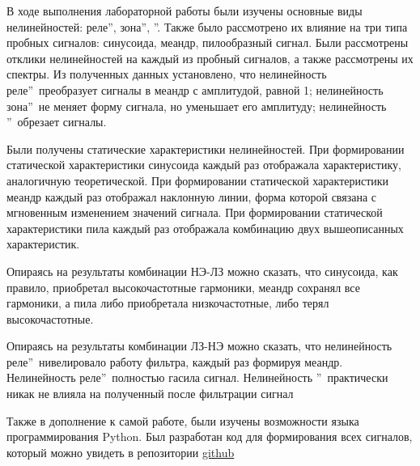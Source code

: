 В ходе выполнения лабораторной работы были изучены основные виды
нелинейностей:  реле\textquotedblright,
 зона\textquotedblright,
\textquotedblright. Также было
рассмотрено их влияние на три типа пробных сигналов: синусоида,
меандр, пилообразный сигнал. Были рассмотрены отклики нелинейностей
на каждый из пробный сигналов, а также рассмотрены их спектры.
Из полученных данных установлено, что нелинейность
 реле\textquotedblright\ преобразует сигналы
в меандр с амплитудой, равной 1; нелинейность
 зона\textquotedblright\ не меняет форму
сигнала, но уменьшает его амплитуду; нелинейность
\textquotedblright\ обрезает сигналы.

Были получены статические характеристики нелинейностей. При формировании
статической характеристики синусоида каждый раз отображала характеристику,
аналогичную теоретической. При формировании статической характеристики
меандр каждый раз отображал наклонную линии, форма которой связана с
мгновенным изменением значений сигнала. При формировании статической
характеристики пила каждый раз отображала комбинацию двух вышеописанных
характеристик. 

Опираясь на результаты комбинации НЭ-ЛЗ можно сказать, что синусоида,
как правило, приобретал высокочастотные гармоники, меандр сохранял
все гармоники, а пила либо приобретала низкочастотные, либо терял
высокочастотные.

Опираясь на результаты комбинации ЛЗ-НЭ можно сказать, что
нелинейность  реле\textquotedblright\ 
нивелировало работу фильтра, каждый раз формируя меандр.
Нелинейность  реле\textquotedblright\  
полностью гасила сигнал. Нелинейность 
\textquotedblleftНасыщение\textquotedblright\ практически никак не
влияла на полученный после фильтрации сигнал

Также в дополнение к самой работе, были изучены возможности языка
программирования Python. Был разработан код для формирования всех сигналов,
который можно увидеть в репозитории \href{https://github.com/MaxAizy/TAC/tree/lab1}{github}